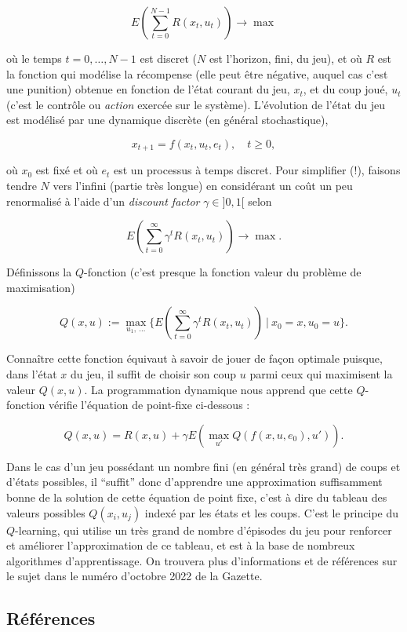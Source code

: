 \[ E\left(\sum_{t=0}^{N-1} R(x_t,u_t)\right) \to \max \]

où le temps \(t=0,\dots,N-1\) est discret (\(N\) est l'horizon, fini, du
jeu), et où \(R\) est la fonction qui modélise la récompense (elle peut
être négative, auquel cas c'est une punition) obtenue en fonction de
l'état courant du jeu, \(x_t\), et du coup joué, \(u_t\) (c'est le
contrôle ou \emph{action} exercée sur le système). L'évolution de l'état
du jeu est modélisé par une dynamique discrète (en général
stochastique),

\[ x_{t+1} = f(x_t,u_t,e_t),\quad t \geq 0, \]

où \(x_0\) est fixé et où \(e_t\) est un processus à temps discret. Pour
simplifier (!), faisons tendre \(N\) vers l'infini (partie très longue)
en considérant un coût un peu renormalisé à l'aide d'un \emph{discount
factor} \(\gamma \in ]0,1[\) selon

\[ E\left(\sum_{t=0}^\infty \gamma^t R(x_t,u_t)\right) \to \max. \]

Définissons la \(Q\)-fonction (c'est presque la fonction valeur du
problème de maximisation)

\[ Q(x,u) := \max_{u_1,\ \dots} \lbrace E\left(\sum_{t=0}^\infty \gamma^t R(x_t,u_t)\right) \ |\ x_0 = x, u_0 = u \rbrace. \]

Connaître cette fonction équivaut à savoir de jouer de façon optimale
puisque, dans l'état \(x\) du jeu, il suffit de choisir son coup \(u\)
parmi ceux qui maximisent la valeur \(Q(x,u)\). La programmation
dynamique nous apprend que cette \(Q\)-fonction vérifie l'équation de
point-fixe ci-dessous :

\[ Q(x,u) = R(x,u) + \gamma E(\max_{u'} Q(f(x,u,e_0),u')). \]

Dans le cas d'un jeu possédant un nombre fini (en général très grand) de
coups et d'états possibles, il ``suffit'' donc d'apprendre une
approximation suffisamment bonne de la solution de cette équation de
point fixe, c'est à dire du tableau des valeurs possibles \(Q(x_i,u_j)\)
indexé par les états et les coups. C'est le principe du \(Q\)-learning,
qui utilise un très grand de nombre d'épisodes du jeu pour renforcer et
améliorer l'approximation de ce tableau, et est à la base de nombreux
algorithmes d'apprentissage. On trouvera plus d'informations et de
références sur le sujet dans le numéro d'octobre 2022 de la Gazette.

\hypertarget{ruxe9fuxe9rences}{%
\subsection{Références}\label{ruxe9fuxe9rences}}

